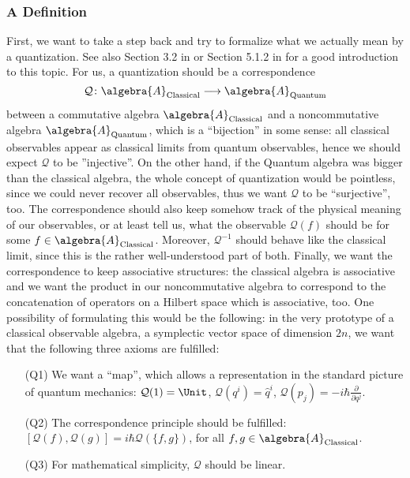 \subsubsection{A Definition}
First, we want to take a step back and try to formalize what we actually mean by a 
quantization. See also Section 3.2 in \cite{esposito:2015a} or Section 5.1.2 in
\cite{waldmann:2007a} for a good introduction to this topic. For us, a 
quantization should be a correspondence
\begin{equation*}
	\mathcal{Q}
	\colon
	\algebra{A}_{\mathrm{Classical}}
	\longrightarrow
	\algebra{A}_{\mathrm{Quantum}}
\end{equation*}
between a commutative algebra $\algebra{A}_{\mathrm{Classical}}$ and a 
noncommutative algebra $\algebra{A}_{\mathrm{Quantum}}$, which is a 
``bijection'' in some sense: all classical observables appear as classical 
limits from quantum observables, hence we should expect $\mathcal{Q}$ to be 
''injective''. On the other hand, if the Quantum algebra was bigger than the 
classical algebra, the whole concept of quantization would be pointless, since 
we could never recover all observables, thus we want $\mathcal{Q}$ to be 
``surjective'', too. The correspondence should also keep somehow track of the 
physical meaning of our observables, or at least tell us, what the observable 
$\mathcal{Q}(f)$ should be for some $f \in \algebra{A}_{\mathrm{Classical}}$. 
Moreover, $\mathcal{Q}^{-1}$ should behave like the classical limit, since this 
is the rather well-understood part of both. Finally, we want the correspondence to
keep associative structures: the classical algebra is associative and we want 
the product in our noncommutative algebra to correspond to the concatenation of 
operators on a Hilbert space which is associative, too. One possibility of 
formulating this would be the following: in the very prototype of a classical 
observable algebra, a symplectic vector space of dimension $2n$, 
we want that the following three axioms are fulfilled:
\begin{enumerate}
	\item[(Q1)]
	We want a ``map'', which allows a representation in the standard 
	picture of quantum mechanics:
	$\mathcal{Q}(1) = \Unit$, 
	$\mathcal{Q}(q^i) = \hat{q}^i$, 
	$\mathcal{Q}(p_j) = - i \hbar \frac{\partial}{\partial q^j}$.
	
	\item[(Q2)]
	The correspondence principle should be fulfilled:
	$[\mathcal{Q}(f), \mathcal{Q}(g)] = i \hbar \mathcal{Q}(\{f, g\})$, 
	for all $f, g \in \algebra{A}_{\mathrm{Classical}}$.
	
	\item[(Q3)]
	For mathematical simplicity, $\mathcal{Q}$ should be linear.
\end{enumerate}
